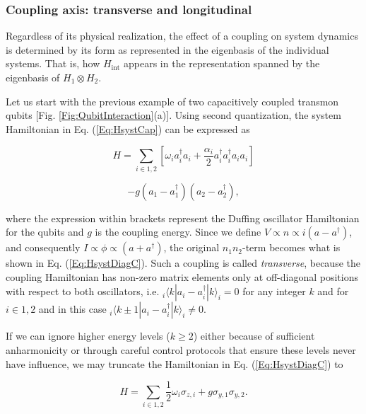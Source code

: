 \documentclass[aip,apr,twocolumn,showpacs,superscriptaddress,groupedaddress,nofootinbib,reprint]{revtex4-1}  %
\begin{document}
\subsubsection{\label{sec:couplingAxis}Coupling axis: transverse and longitudinal}

Regardless of its physical realization, the effect of a coupling on system dynamics is determined by its form as represented in the eigenbasis of the individual systems. That is, how $H_{\text{int}}$ appears in the representation spanned by the eigenbasis of $H_1 \otimes H_2$.

Let us start with the previous example of two capacitively coupled transmon qubits [Fig. \ref{Fig:QubitInteraction}(a)]. Using second quantization, the system Hamiltonian in Eq. (\ref{Eq:HsystCap}) can be expressed as

\begin{equation*}
H = \sum_{i \in {1,2}} \left[ \omega_i a_{i}^{\dagger}a_{i} + \frac{\alpha_i}{2}a_{i}^{\dagger}a_{i}^{\dagger}a_{i}a_{i}\right]
\end{equation*}

\begin{equation}
- g \left(a_1 - a_{1}^{\dagger}\right)\left(a_2 - a_{2}^{\dagger}\right),
\label{Eq:HsystDiagC}
\end{equation}

\noindent where the expression within brackets represent the Duffing oscillator Hamiltonian for the qubits and $g$ is the coupling energy. Since we define $V \propto n \propto i(a - a^{\dagger})$, and consequently $I \propto \phi \propto (a + a^{\dagger})$, the original $n_{1}n_{2}$-term becomes what is shown in Eq. (\ref{Eq:HsystDiagC}). Such a coupling is called \textit{transverse}, because the coupling Hamiltonian has non-zero matrix elements only at off-diagonal positions with respect to both oscillators, i.e. $_{i}\langle k|a_{i} - a_{i}^{\dagger}|k\rangle_{i} = 0$ for any integer $k$ and for $i \in {1,2}$ and in this case $_{i}\langle k \pm 1|a_{i} - a_{i}^{\dagger}|k\rangle_{i} \neq 0$.

If we can ignore higher energy levels ($k \geq 2$) either because of sufficient anharmonicity or through careful control protocols that ensure these levels never have influence, we may truncate the Hamiltonian in Eq. (\ref{Eq:HsystDiagC}) to

\begin{equation}
H = \sum_{i \in {1,2}} \frac{1}{2}\omega_i \sigma_{z,i} + g \sigma_{y,1}\sigma_{y,2}.
\label{Eq:HsystDiagCtrunc}
\end{equation}
\end{document}
